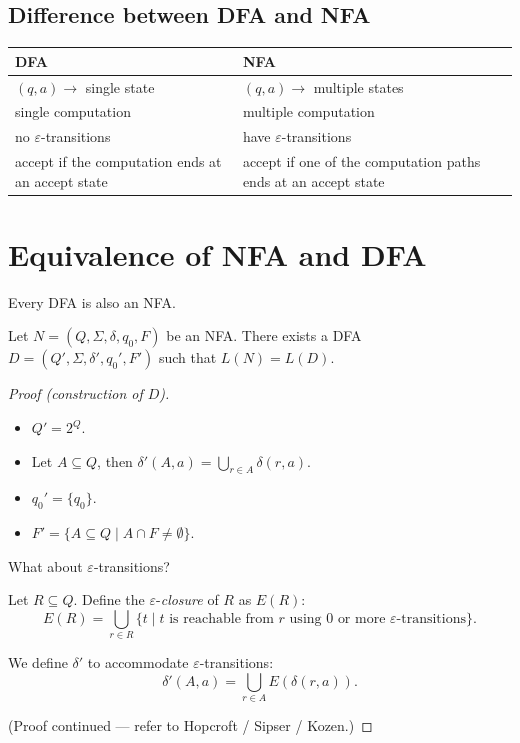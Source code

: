 \subsection{Difference between DFA and NFA}

\begin{center}
\begin{tabular}{p{6.5cm} p{6.5cm}}
\textbf{DFA} & \textbf{NFA} \\ \hline
$(q,a) \to$ single state & $(q,a) \to$ multiple states \\
single computation & multiple computation \\
no $\varepsilon$-transitions & have $\varepsilon$-transitions \\
accept if the computation ends at an accept state & accept if one of the computation paths ends at an accept state
\end{tabular}
\end{center}

\section{Equivalence of NFA and DFA}

Every DFA is also an NFA.

\begin{blackbox}
\begin{theorem}
Let $N = (Q, \Sigma, \delta, q_0, F)$ be an NFA. There exists a DFA $D = (Q', \Sigma, \delta', q_0', F')$ such that $L(N) = L(D)$.
\end{theorem}
\end{blackbox}

\begin{proof}[Proof (construction of $D$)]
\begin{itemize}
    \item $Q' = 2^Q$.
    \item Let $A \subseteq Q$, then $\delta'(A, a) = \bigcup_{r \in A} \delta(r, a)$.
    \item $q_0' = \{q_0\}$.
    \item $F' = \{ A \subseteq Q \mid A \cap F \neq \emptyset \}$.
\end{itemize}

\noindent What about $\varepsilon$-transitions?

Let $R \subseteq Q$. Define the $\varepsilon$-\emph{closure} of $R$ as $E(R)$:
\[
E(R) = \bigcup_{r \in R} \{ t \mid t \text{ is reachable from } r \text{ using } 0 \text{ or more } \varepsilon\text{-transitions} \}.
\]

We define $\delta'$ to accommodate $\varepsilon$-transitions:
\[
\delta'(A, a) = \bigcup_{r \in A} E(\delta(r, a)).
\]

\noindent (Proof continued — refer to Hopcroft / Sipser / Kozen.)
\end{proof}

